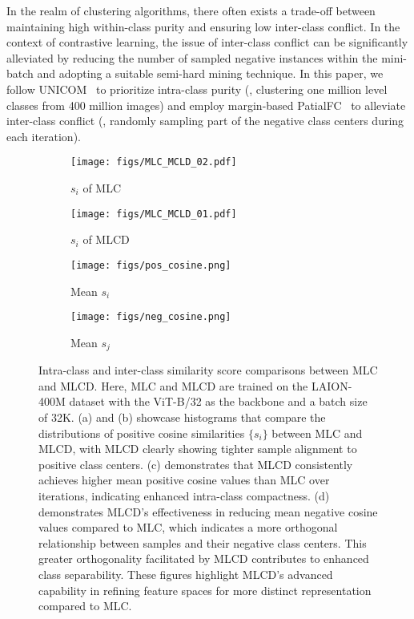 In the realm of clustering algorithms, there often exists a trade-off between maintaining high within-class purity and ensuring low inter-class conflict. In the context of contrastive learning, the issue of inter-class conflict can be significantly alleviated by reducing the number of sampled negative instances within the mini-batch and adopting a suitable semi-hard mining technique. In this paper, we follow UNICOM~\cite{an2023unicom} to prioritize intra-class purity (\ie, clustering one million level classes from 400 million images) and employ margin-based PatialFC~\cite{an2022killing,deng2019arcface} to alleviate inter-class conflict (\ie, randomly sampling part of the negative class centers during each iteration). 

\begin{figure}[!t]
\centering
  \begin{subfigure}{0.24\textwidth}
    \centering
    \texttt{[image: figs/MLC\_MCLD\_02.pdf]}
    \caption{$s_i$ of MLC} 
    \label{cosine:mlc}
  \end{subfigure}
  \begin{subfigure}{0.24\textwidth}
    \centering
    \texttt{[image: figs/MLC\_MCLD\_01.pdf]}
    \caption{$s_i$ of MLCD}
    \label{cosine:mlcd}
  \end{subfigure}
  \begin{subfigure}{0.24\textwidth}
    \centering
    \texttt{[image: figs/pos\_cosine.png]}
    \caption{Mean $s_i$}
    \label{cosine:si}
  \end{subfigure}
  \begin{subfigure}{0.24\textwidth}
    \centering
    \texttt{[image: figs/neg\_cosine.png]}
    \caption{Mean $s_j$}
    \label{cosine:sj}
  \end{subfigure}
  \caption{Intra-class and inter-class similarity score comparisons between MLC and MLCD. Here, MLC and MLCD are trained on the LAION-400M dataset with the ViT-B/32 as the backbone and a batch size of 32K. (a) and (b) showcase histograms that compare the distributions of positive cosine similarities $\{s_i\}$ between MLC and MLCD, with MLCD clearly showing tighter sample alignment to positive class centers. (c) demonstrates that MLCD consistently achieves higher mean positive cosine values than MLC over iterations, indicating enhanced intra-class compactness. (d) demonstrates MLCD’s effectiveness in reducing mean negative cosine values compared to MLC, which indicates a more orthogonal relationship between samples and their negative class centers. This greater orthogonality facilitated by MLCD contributes to enhanced class separability. These figures highlight MLCD’s advanced capability in refining feature spaces for more distinct representation compared to MLC.}
  \label{fig:mlc_vs_mlcd}
  \vspace{-4mm}
\end{figure}


